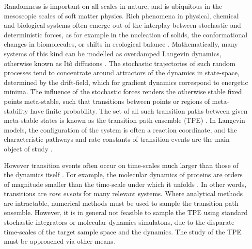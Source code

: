 \documentclass[]{cam-thesis}
\begin{document}
Randomness is important on all scales in nature, and is ubiquitous in the mesoscopic scales of soft matter physics. Rich phenomena in physical, chemical and biological systems often emerge out of the interplay between stochastic and deterministic forces, as for example in the nucleation of solids, the conformational changes in biomolecules, or shifts in ecological balance \citep{faccioliDominantPathwaysProtein2006a, demarcoPhaseTransitionModel2001a, gardnerConstructionGeneticToggle2000a, mangelBarrierTransitionsDriven1994a, wolynesNavigatingFoldingRoutes1995a, huangMolecularMathematicalBasis2012a, paninskiMostLikelyVoltage2006a, noltingBallsCupsQuasipotentials2016a, leeFindingMultipleReaction2017a}. Mathematically, many systems of this kind can be modelled as overdamped Langevin dynamics, otherwise known as It\^{o} diffusions \citep{kampenStochasticProcessesPhysics2011a, gardinerStochasticMethodsHandbook2010a, riskenFokkerPlanckEquationMethods2012a, bharucha-reidElementsTheoryMarkov2012a}. The stochastic trajectories of such random processes tend to concentrate around attractors of the dynamics in state-space, determined by the drift-field, which for gradient dynamics correspond to energetic minima. The influence of the stochastic forces renders the otherwise stable fixed points meta-stable, such that transitions between points or regions of meta-stability have finite probability. The set of all such transition paths between given meta-stable states is known as the transition path ensemble (TPE) \citep{bolhuisTransitionPathSampling2002a}. In Langevin models, the configuration of the system is often a reaction coordinate, and the characteristic pathways and rate constants of transition events are the main object of study \citep{dellagoCalculationReactionRate1999a, arjunUnbiasedAtomisticInsight2019, geisslerAutoionizationLiquidWater2001, carterConstrainedReactionCoordinate1989, laioEscapingFreeenergyMinima2002, bestMicroscopicInterpretationFolding2016, arjunUnbiasedAtomisticInsight2019}.

However transition events often occur on time-scales much larger than those of the dynamics itself \citep{petersReactionRateTheory2017, bolhuisTransitionPathSamplinga, grafkeLongTermEffects2017}. For example, the molecular dynamics of proteins are orders of magnitude smaller than the time-scale under which it unfolds \citep{veitshansProteinFoldingKinetics1997a}. In other words, transitions are \textit{rare events} for many relevant systems. Where analytical methods are intractable, numerical methods must be used to sample the transition path ensemble. However, it is in general not feasible to sample the TPE using standard stochastic integrators or molecular dynamics simulatons, due to the disparate time-scales of the target sample space and the dynamics. The study of the TPE must be approached via other means.
\end{document}
